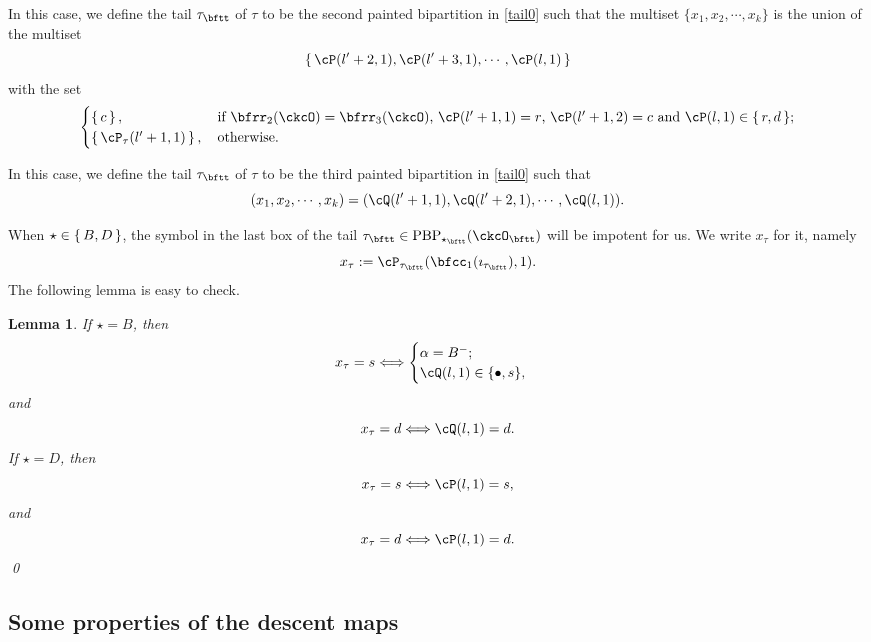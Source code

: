 \documentclass[12pt,a4paper]{amsart}
\numberwithin{equation}{section}
\newtheorem{lem}[thm]{Lemma}
\theoremstyle{remark}
\def\PBP{\mathrm{PBP}}
\begin{document}
\smallskip

 \smallskip






In this case, we define the tail $\tau_\bftt$ of $\tau$ to be the second painted bipartition in \eqref{tail0} such that the multiset $\{x_1, x_2, \cdots, x_k\}$ is the
union of the multiset
\[
\set{\cP(l'+2,1),\cP(l'+3,1),\cdots, \cP(l,1)}
\]
with the set
\[
  \begin{cases}
 \set{c}, &
 \,
  \text{if $\bfrr_2(\ckcO)=\bfrr_3(\ckcO)$,
  $\cP(l'+1,1) = r$, $\cP(l'+1,2) = c$ and $\cP(l,1)\in \set{r,d}$};  \\
\set{\cP_\tau(l'+1,1)},&
\,   \text{otherwise.}
\end{cases}
\]

 \smallskip

 \smallskip

In this case, we define the tail $\tau_\bftt$ of $\tau$ to be the third painted bipartition in \eqref{tail0} such that
\[
  (x_1, x_2, \cdots, x_k)= (\cQ(l'+1,1),\cQ(l'+2,1),\cdots, \cQ(l,1)).
\]


 When $\star \in \set{B,D}$, the symbol in the last box of the tail $\tau_\bftt\in \PBP_{\star_\bftt}(\ckcO_\bftt)$ will be impotent for us. We write $x_\tau$ for it, namely
\[
x_\tau := \cP_{\tau_\bftt}(\bfcc_1(\imath_{\tau_\bftt}),1).
\]
 The following lemma is easy to check.

\begin{lem}\label{tailtip}
If $\star=B$, then
\[
x_\tau=s\Longleftrightarrow
\begin{cases}
  \alpha=B^-;\\
  \cQ(l,1) \in\{\bullet, s\},
  \end{cases}
\]
and
\[
x_\tau=d \Longleftrightarrow
\cQ(l,1) =d.
\]
If $\star=D$, then
\[
x_\tau=s\Longleftrightarrow \cP(l,1) = s,
\]
and
\[
x_\tau=d\Longleftrightarrow \cP(l,1) =d.
\]
\qed
\end{lem}







\subsection{Some properties of the descent maps}
\end{document}
